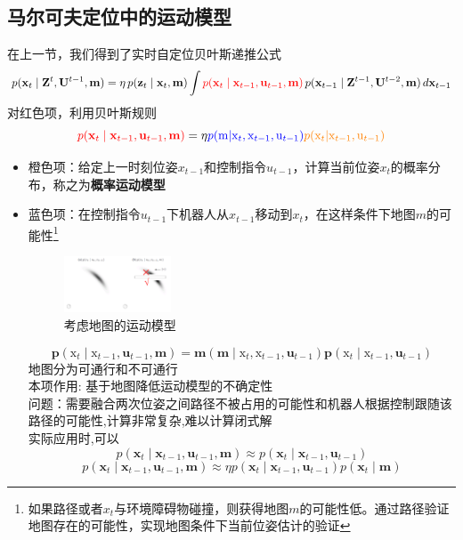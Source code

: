 \documentclass[../main.tex]{subfiles}
\begin{document}
\subsection{马尔可夫定位中的运动模型}
        在上一节，我们得到了实时自定位贝叶斯递推公式
        \[
        p(\mathbf{x}_t \mid \mathbf{Z}^{t}, \mathbf{U}^{t-1}, \mathbf{m})
        = \eta \, p(\mathbf{z}_t \mid \mathbf{x}_t, \mathbf{m})
        \int \textcolor{red}{p(\mathbf{x}_t \mid \mathbf{x}_{t-1}, \mathbf{u}_{t-1}, \mathbf{m})}
        \, p(\mathbf{x}_{t-1} \mid \mathbf{Z}^{t-1}, \mathbf{U}^{t-2}, \mathbf{m})
        \, d\mathbf{x}_{t-1}
        \]
        对红色项，利用贝叶斯规则
        $$\textcolor{red}{p(\mathbf{x}_t \mid \mathbf{x}_{t-1}, \mathbf{u}_{t-1}, \mathbf{m})}=\eta     \textcolor{blue}{p(\mathrm{m}|\mathrm{x}_t,\mathrm{x}_{t-1},\mathrm{u}_{t-1})}\textcolor{orange}{p(\mathrm{x}_t|\mathrm{x}_{t-1},\mathrm{u}_{t-1})}$$
        \begin{itemize}
            \item 橙色项：给定上一时刻位姿$x_{t-1}$和控制指令$u_{t-1}$，计算当前位姿$x_{t}$的概率分布，称之为\textbf{概率运动模型}
            \item 蓝色项：在控制指令$u_{t-1}$下机器人从$x_{t-1}$移动到$x_{t}$，在这样条件下地图$m$的可能性\footnote{如果路径或者$x_t$与环境障碍物碰撞，则获得地图$m$的可能性低。通过路径验证地图存在的可能性，实现地图条件下当前位姿估计的验证}
            \begin{figure}[H]
                \centering
                \includegraphics[width=0.3\textwidth]{images/map.png}
                \caption{考虑地图的运动模型}
            \end{figure}
            {\small\kaishu 
            $$ \mathbf{p}\left( {{\mathrm{x}}_{t} \mid  {\mathrm{x}}_{t - 1},{\mathbf{u}}_{t - 1},\mathbf{m}}\right)  = \mathbf{m}\left( {\mathbf{m} \mid  {\mathrm{x}}_{t},{\mathrm{x}}_{t - 1},{\mathbf{u}}_{t - 1}}\right) \mathbf{p}\left( {{\mathrm{x}}_{t} \mid  {\mathrm{x}}_{t - 1},{\mathbf{u}}_{t - 1}}\right)$$
            地图分为可通行和不可通行\\
            本项作用: 基于地图降低运动模型的不确定性\\
            问题：需要融合两次位姿之间路径不被占用的可能性和机器人根据控制跟随该路径的可能性,计算非常复杂,难以计算闭式解\\
            实际应用时,可以
            $$ p\left( {{\mathbf{x}}_{t} \mid  {\mathbf{x}}_{t - 1},{\mathbf{u}}_{t - 1},\mathbf{m}}\right)  \approx  p\left( {{\mathbf{x}}_{t} \mid  {\mathbf{x}}_{t - 1},{\mathbf{u}}_{t - 1}}\right) $$
            $$ p\left( {{\mathbf{x}}_{t} \mid  {\mathbf{x}}_{t - 1},{\mathbf{u}}_{t - 1},\mathbf{m}}\right)  \approx  {\eta p}\left( {{\mathbf{x}}_{t} \mid  {\mathbf{x}}_{t - 1},{\mathbf{u}}_{t - 1}}\right) p\left( {{\mathbf{x}}_{t} \mid  \mathbf{m}}\right) $$
            }
        \end{itemize}
\end{document}
